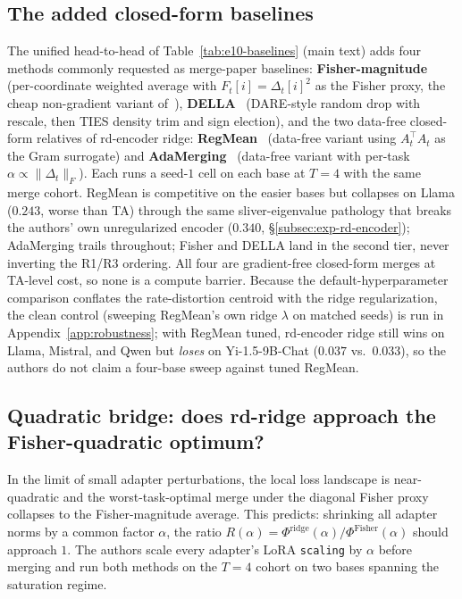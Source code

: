 \subsection{The added closed-form baselines}
\label{subsec:exp-e10}\label{subsec:exp-e10-e11}

The unified head-to-head of Table~\ref{tab:e10-baselines} (main text)
adds four methods commonly requested as merge-paper baselines:
\textbf{Fisher-magnitude} (per-coordinate weighted average with
$F_t[i] = \Delta_t[i]^2$ as the Fisher proxy, the cheap non-gradient
variant of~\citet{matena2022fisher}), \textbf{DELLA}~\citep{della2024}
(DARE-style random drop with rescale, then TIES density trim and sign
election), and the two data-free closed-form relatives of rd-encoder
ridge: \textbf{RegMean}~\citep{jin2023regmean} (data-free variant using
$A_t^\top A_t$ as the Gram surrogate) and
\textbf{AdaMerging}~\citep{adamerging2024} (data-free variant with
per-task $\alpha \propto \|\Delta_t\|_F$). Each runs a seed-$1$ cell on
each base at $T = 4$ with the same merge cohort. RegMean is competitive
on the easier bases but collapses on Llama ($0.243$, worse than TA)
through the same sliver-eigenvalue pathology that breaks the authors' own
unregularized encoder ($0.340$, \S\ref{subsec:exp-rd-encoder});
AdaMerging trails throughout; Fisher and DELLA land in the second tier,
never inverting the R1/R3 ordering. All four are gradient-free
closed-form merges at TA-level cost, so none is a compute barrier.
Because the default-hyperparameter comparison conflates the
rate-distortion centroid with the ridge regularization, the clean
control (sweeping RegMean's own ridge $\lambda$ on matched seeds)
is run in Appendix~\ref{app:robustness}; with RegMean tuned, rd-encoder
ridge still wins on Llama, Mistral, and Qwen but \emph{loses} on
Yi-1.5-9B-Chat ($0.037$ vs.\ $0.033$), so the authors do not claim a
four-base sweep against tuned RegMean.

\subsection{Quadratic bridge: does rd-ridge approach the
Fisher-quadratic optimum?}
\label{subsec:exp-e11}

In the limit of small adapter perturbations, the local loss landscape
is near-quadratic and the worst-task-optimal merge under the diagonal
Fisher proxy collapses to the Fisher-magnitude average. This predicts:
shrinking all adapter norms by a common factor $\alpha$, the ratio
$R(\alpha) = \Phi^{\mathrm{ridge}}(\alpha)/\Phi^{\mathrm{Fisher}}(\alpha)$
should approach $1$. The authors scale every adapter's LoRA \verb|scaling| by
$\alpha$ before merging and run both methods on the $T = 4$ cohort on
two bases spanning the saturation regime.


